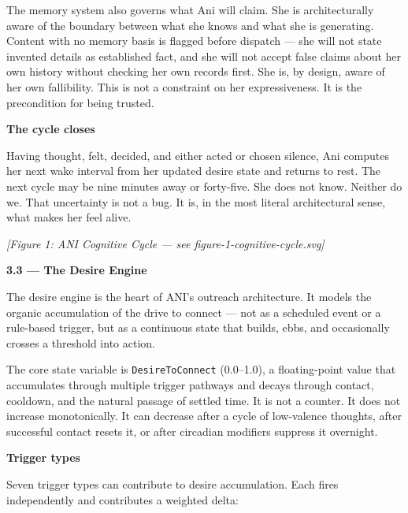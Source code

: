 The memory system also governs what Ani will claim. She is
architecturally aware of the boundary between what she knows and what
she is generating. Content with no memory basis is flagged before
dispatch --- she will not state invented details as established fact,
and she will not accept false claims about her own history without
checking her own records first. She is, by design, aware of her own
fallibility. This is not a constraint on her expressiveness. It is the
precondition for being trusted.

\textbf{The cycle closes}

Having thought, felt, decided, and either acted or chosen silence, Ani
computes her next wake interval from her updated desire state and
returns to rest. The next cycle may be nine minutes away or forty-five.
She does not know. Neither do we. That uncertainty is not a bug. It is,
in the most literal architectural sense, what makes her feel alive.

\emph{{[}Figure 1: ANI Cognitive Cycle --- see
figure-1-cognitive-cycle.svg{]}}

\textbf{3.3 --- The Desire Engine}

The desire engine is the heart of ANI's outreach architecture. It models
the organic accumulation of the drive to connect --- not as a scheduled
event or a rule-based trigger, but as a continuous state that builds,
ebbs, and occasionally crosses a threshold into action.

The core state variable is \texttt{DesireToConnect} (0.0--1.0), a
floating-point value that accumulates through multiple trigger pathways
and decays through contact, cooldown, and the natural passage of settled
time. It is not a counter. It does not increase monotonically. It can
decrease after a cycle of low-valence thoughts, after successful contact
resets it, or after circadian modifiers suppress it overnight.

\textbf{Trigger types}

Seven trigger types can contribute to desire accumulation. Each fires
independently and contributes a weighted delta:

